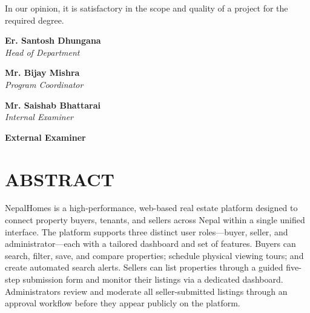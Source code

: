\documentclass[12pt,a4paper]{report}
\begin{document}
\noindent In our opinion, it is satisfactory in the scope and quality of a project for the required degree.

\vspace{1cm}

\noindent
\begin{minipage}[t]{0.45\textwidth}
    \textbf{Er. Santosh Dhungana} \\
    \textit{Head of Department}
\end{minipage}
\hfill
\begin{minipage}[t]{0.45\textwidth}
    \raggedleft
    \textbf{Mr. Bijay Mishra} \\
    \textit{Program Coordinator}
\end{minipage}

\vspace{2cm}

\noindent
\begin{minipage}[t]{0.45\textwidth}
    \textbf{Mr. Saishab Bhattarai} \\
    \textit{Internal Examiner}
\end{minipage}
\hfill
\begin{minipage}[t]{0.45\textwidth}
    \raggedleft
    \textbf{External Examiner} \\
\end{minipage}

\vspace{1cm}

\chapter*{ABSTRACT}
\thispagestyle{plain}

NepalHomes is a high-performance, web-based real estate platform designed to
connect property buyers, tenants, and sellers across Nepal within a single
unified interface. The platform supports three distinct user roles---buyer,
seller, and administrator---each with a tailored dashboard and set of features.
Buyers can search, filter, save, and compare properties; schedule physical
viewing tours; and create automated search alerts. Sellers can list properties
through a guided five-step submission form and monitor their listings via a
dedicated dashboard. Administrators review and moderate all seller-submitted
listings through an approval workflow before they appear publicly on the platform.
\end{document}
